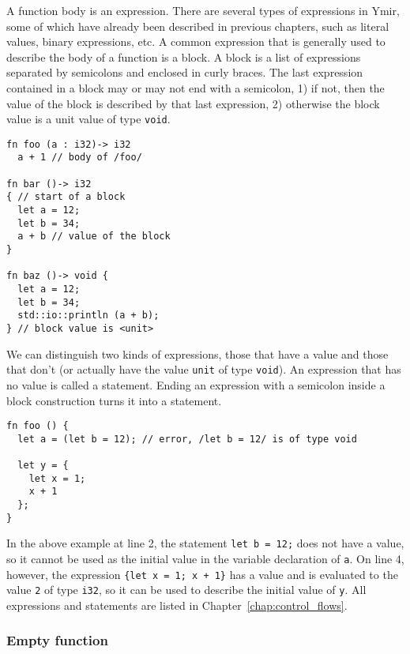 A function body is an expression. There are several types of expressions in
Ymir, some of which have already been described in previous chapters, such as
literal values, binary expressions, etc. A common expression that is generally
used to describe the body of a function is a block. A block is a list of
expressions separated by semicolons and enclosed in curly braces. The last
expression contained in a block may or may not end with a semicolon, 1) if not,
then the value of the block is described by that last expression, 2) otherwise
the block value is a unit value of type \texttt{void}.

\begin{lstlisting}[style=coloredverbatim]
fn foo (a : i32)-> i32
  a + 1 // body of /foo/

fn bar ()-> i32
{ // start of a block
  let a = 12;
  let b = 34;
  a + b // value of the block
}

fn baz ()-> void {
  let a = 12;
  let b = 34;
  std::io::println (a + b);
} // block value is <unit>

\end{lstlisting}

We can distinguish two kinds of expressions, those that have a value and those
that don't (or actually have the value \texttt{unit} of type \texttt{void}). An
expression that has no value is called a statement. Ending an expression with a
semicolon inside a block construction turns it into a statement.

\begin{lstlisting}[style=coloredverbatim]
fn foo () {
  let a = (let b = 12); // error, /let b = 12/ is of type void

  let y = {
    let x = 1;
    x + 1
  };
}
\end{lstlisting}

In the above example at line 2, the statement \texttt{let b = 12;} does not have
a value, so it cannot be used as the initial value in the variable declaration
of \texttt{a}. On line 4, however, the expression \texttt{\{let x = 1; x + 1\}}
has a value and is evaluated to the value \texttt{2} of type \texttt{i32}, so it
can be used to describe the initial value of \texttt{y}. All expressions and
statements are listed in Chapter~\ref{chap:control_flows}.

\subsubsection{Empty function}

